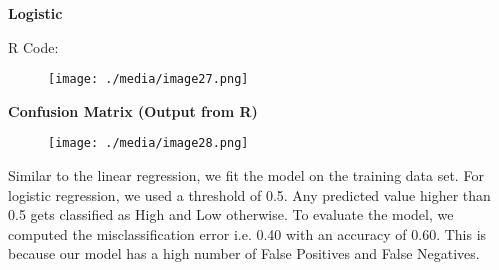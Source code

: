 \documentclass[12pt]{article}
\begin{document}
\vspace{\baselineskip}
\begin{justify}
\textbf{Logistic}
\end{justify}\par

\begin{justify}
R Code:
\end{justify}\par




\begin{figure}[H]
	\begin{Center}
		\texttt{[image: ./media/image27.png]}
	\end{Center}
\end{figure}



\par

\begin{justify}
\textbf{Confusion Matrix (Output from R)}
\end{justify}\par




\begin{figure}[H]
	\begin{Center}
		\texttt{[image: ./media/image28.png]}
	\end{Center}
\end{figure}



\par

\begin{justify}
Similar to the linear regression, we fit the model on the training data set. For logistic regression, we used a threshold of 0.5. Any predicted value higher than 0.5 gets classified as High and Low otherwise. To evaluate the model, we computed the misclassification error i.e. 0.40 with an accuracy of 0.60. This is because our model has a high number of False Positives and False Negatives. 
\end{justify}\par
\end{document}
